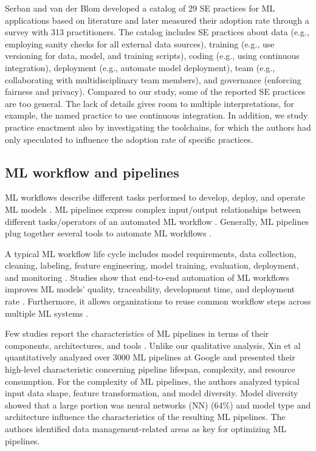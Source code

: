 \documentclass{IEEEcsmag}
\begin{document}
Serban and van der Blom \cite{Serban2020Practices} developed a catalog of 29 SE practices for ML applications based on literature and later measured their adoption rate through a survey with 313 practitioners. The catalog includes SE practices about data (e.g., employing sanity checks for all external data sources), training (e.g., use versioning for data, model, and training scripts), coding (e.g., using continuous integration), deployment (e.g., automate model deployment), team (e.g., collaborating with multidisciplinary team members), and governance (enforcing fairness and privacy). Compared to our study, some of the reported SE practices are too general. The lack of details gives room to multiple interpretations, for example, the named practice to use continuous integration. In addition, we study practice enactment also by investigating the toolchains, for which the authors \cite{Serban2020Practices} had only speculated to influence the adoption rate of specific practices. 

\subsection{ML workflow and pipelines}

ML workflows describe different tasks performed to develop, deploy, and operate ML models  \cite{Amershi2019}. ML pipelines express complex input/output relationships between different tasks/operators of an automated ML workflow \cite{Doris2021MLPipelines}. Generally, ML pipelines plug together several tools to automate ML workflows \cite{Hummer2019IBM}.

A typical ML workflow life cycle includes model requirements, data collection, cleaning, labeling, feature engineering, model training, evaluation, deployment, and monitoring  \cite{Amershi2019}. Studies show that end-to-end automation of ML workflows improves ML models’ quality, traceability, development time, and deployment rate  \cite{Doris2021MLPipelines, Hummer2019IBM}. Furthermore, it allows organizations to reuse common workflow steps across multiple ML systems \cite{Baylor2017, Hummer2019IBM}.

Few studies report the characteristics of ML pipelines in terms of their components, architectures, and tools \cite{Hummer2019IBM,Doris2021MLPipelines}. Unlike our qualitative analysis, Xin et al \cite{Doris2021MLPipelines} quantitatively analyzed over 3000 ML pipelines at Google and presented their high-level characteristic concerning pipeline lifespan, complexity, and resource consumption. For the complexity of ML pipelines, the authors analyzed typical input data shape, feature transformation, and model diversity. Model diversity showed that a large portion was neural networks (NN) (64\%) and model type and architecture influence the characteristics of the resulting ML pipelines. The authors \cite{Doris2021MLPipelines} identified data management-related areas as key for optimizing ML pipelines. 
\end{document}
